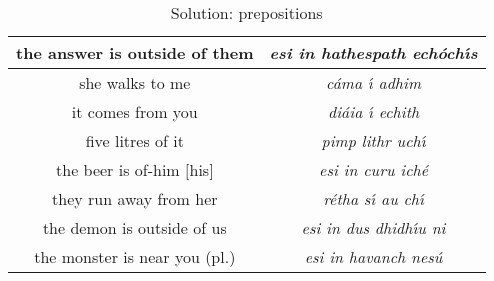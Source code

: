 \begin{table}[H]
{\begin{tabular}{|c|>{\itshape}c|}
  \midrule
  the answer is outside of them & esi in hathespath ech\'{o}ch\'{\i}s\\
  \midrule
  she walks to me & c\'{a}ma \'{\i} adhim\\
  \midrule
  it comes from you & di\'{a}ia \'{\i} echith\\
  \midrule
  five litres of it & pimp lithr uch\'{\i}\\
  \midrule
  the beer is of-him $[$his$]$ & esi in curu ich\'{e}\\
  \midrule
  they run away from her & r\'{e}tha s\'{\i} au ch\'{\i}\\
  \midrule
  the demon is outside of us & esi in dus dhidh\'{\i}u ni\\
  \midrule
  the monster is near you (pl.) & esi in havanch nes\'{u}\\
  \bottomrule
  \end{tabular}
}
\label{solution_prepositions}
\caption{Solution: prepositions}
\end{table}
